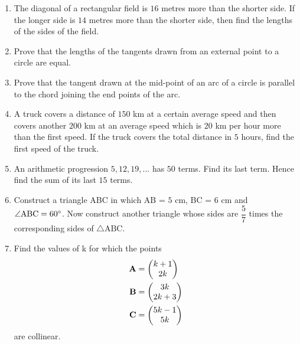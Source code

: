 \documentclass[journal,12pt,twocolumn]{IEEEtran}
\renewcommand\thesection{\arabic{section}}
\begin{document}
\begin{enumerate}[label=\thesection.\arabic*.,ref=\thesection.\theenumi]
\item The diagonal of a rectangular field is $16$ metres more than the shorter side. If the longer side is $14$ metres more than the shorter side, then find the lengths of the sides of the field.
\item Prove that the lengths of the tangents drawn from an external point to a circle are equal.
\item Prove that the tangent drawn at the mid-point of an arc of a circle is parallel to the chord joining the end points of the arc.
\item A truck covers a distance of $150$ km at a certain average speed and then covers another $200$ km at an average speed which is $20$ km per hour more than the first speed. If the truck covers the total distance in $5$ hours, find the first speed of the truck.
\item An arithmetic progression $5, 12, 19, ...$ has $50$ terms. Find its last term. Hence find the sum of its last $15$ terms.
\item Construct a triangle ABC in which AB = $5$ cm, BC = $6$ cm and $\angle \text{ABC} = 60\degree$. Now construct another triangle whose sides are $\dfrac{5}{7}$ times the corresponding sides of $\triangle \text{ABC}$.
\item Find the values of k for which the points
\begin{align*}
\mathbf{A} &= \begin{pmatrix}k+1\\2k\end{pmatrix}\\
\mathbf{B} &= \begin{pmatrix}3k\\2k+3\end{pmatrix}\\
\mathbf{C} &= \begin{pmatrix}5k-1\\5k\end{pmatrix}
\end{align*}
are collinear.
\end{enumerate}
\end{document}
